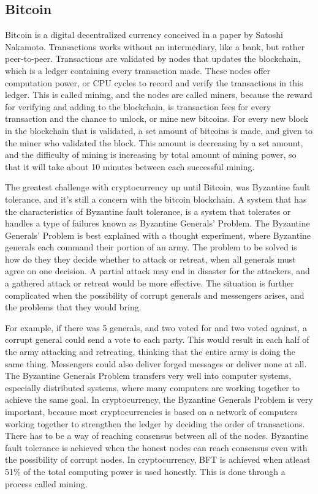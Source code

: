 \documentclass[11pt]{article}
\begin{document}
\subsection{Bitcoin}

Bitcoin is a digital decentralized currency conceived in a paper by Satoshi Nakamoto\cite{nakamoto2009bitcoin}. Transactions works without an intermediary, like a bank, but rather peer-to-peer. Transactions are validated by nodes that updates the blockchain, which is a ledger containing every transaction made. These nodes offer computation power, or CPU cycles to record and verify the transactions in this ledger. This is called mining, and the nodes are called miners, because the reward for verifying and adding to the blockchain, is transaction fees for every transaction and the chance to unlock, or mine new bitcoins. For every new block in the blockchain that is validated, a set amount of bitcoins is made, and given to the miner who validated the block. This amount is decreasing by a set amount, and the difficulty of mining is increasing by total amount of mining power, so that it will take about 10 minutes between each successful mining.

The greatest challenge with cryptocurrency up until Bitcoin, was Byzantine fault tolerance, and it's still a concern with the bitcoin blockchain. A system that has the characteristics of Byzantine fault tolerance, is a system that tolerates or handles a type of failures known as Byzantine Generals' Problem\cite{lamport1982byzantine}. The Byzantine Generals' Problem is best explained with a thought experiment, where Byzantine generals each command their portion of an army. The problem to be solved is how do they they decide whether to attack or retreat, when all generals must agree on one decision. A partial attack may end in disaster for the attackers, and a gathered attack or retreat would be more effective. The situation is further complicated when the possibility of corrupt generals and messengers arises, and the problems that they would bring.

For example, if there was 5 generals, and two voted for and two voted against, a corrupt general could send a vote to each party. This would result in each half of the army attacking and retreating, thinking that the entire army is doing the same thing.  Messengers could also deliver forged messages or deliver none at all. The Byzantine Generals Problem transfers very well into computer systems, especially distributed systems, where many computers are working together to achieve the same goal. In cryptocurrency, the Byzantine Generals Problem is very important, because most cryptocurrencies is based on a network of computers working together to strengthen the ledger by deciding the order of transactions. There has to be a way of reaching consensus between all of the nodes. Byzantine fault tolerance is achieved when the honest nodes can reach consensus even with the possibility of corrupt nodes. In cryptocurrency, BFT is achieved when atleast 51\% of the total computing power is used honestly. This is done through a process called mining.
 
\end{document}
